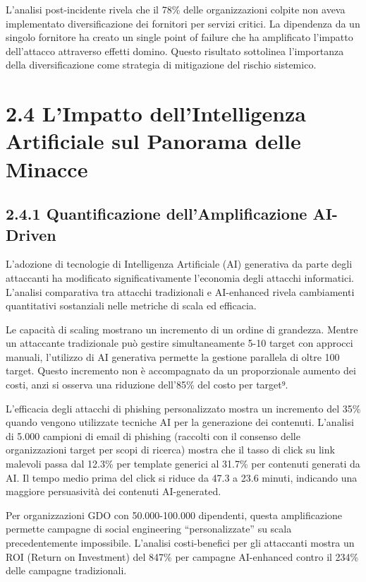 \documentclass[12pt,a4paper,oneside]{book}
\numberwithin{figure}{chapter} %
\numberwithin{table}{chapter}  %
\begin{document}
L'analisi post-incidente rivela che il 78\% delle organizzazioni colpite
non aveva implementato diversificazione dei fornitori per servizi
critici. La dipendenza da un singolo fornitore ha creato un single point
of failure che ha amplificato l'impatto dell'attacco attraverso effetti
domino. Questo risultato sottolinea l'importanza della diversificazione
come strategia di mitigazione del rischio sistemico.

\section{2.4 L'Impatto dell'Intelligenza Artificiale sul Panorama
delle
Minacce}\label{limpatto-dellintelligenza-artificiale-sul-panorama-delle-minacce}

\subsection{2.4.1 Quantificazione dell'Amplificazione
AI-Driven}\label{quantificazione-dellamplificazione-ai-driven}

L'adozione di tecnologie di Intelligenza Artificiale (AI) generativa da
parte degli attaccanti ha modificato significativamente l'economia degli
attacchi informatici. L'analisi comparativa tra attacchi tradizionali e
AI-enhanced rivela cambiamenti quantitativi sostanziali nelle metriche
di scala ed efficacia.

Le capacità di scaling mostrano un incremento di un ordine di grandezza.
Mentre un attaccante tradizionale può gestire simultaneamente 5-10
target con approcci manuali, l'utilizzo di AI generativa permette la
gestione parallela di oltre 100 target. Questo incremento non è
accompagnato da un proporzionale aumento dei costi, anzi si osserva una
riduzione dell'85\% del costo per target⁹.

L'efficacia degli attacchi di phishing personalizzato mostra un
incremento del 35\% quando vengono utilizzate tecniche AI per la
generazione dei contenuti. L'analisi di 5.000 campioni di email di
phishing (raccolti con il consenso delle organizzazioni target per scopi
di ricerca) mostra che il tasso di click su link malevoli passa dal
12.3\% per template generici al 31.7\% per contenuti generati da AI. Il
tempo medio prima del click si riduce da 47.3 a 23.6 minuti, indicando
una maggiore persuasività dei contenuti AI-generated.

Per organizzazioni GDO con 50.000-100.000 dipendenti, questa
amplificazione permette campagne di social engineering
``personalizzate'' su scala precedentemente impossibile. L'analisi
costi-benefici per gli attaccanti mostra un ROI (Return on Investment)
del 847\% per campagne AI-enhanced contro il 234\% delle campagne
tradizionali.
\end{document}
